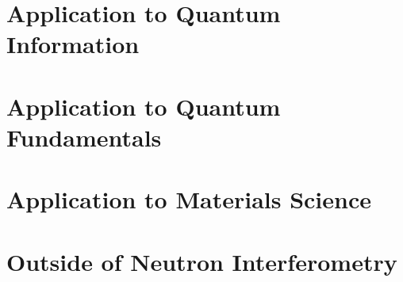\section{Application to Quantum Information}
\section{Application to Quantum Fundamentals}
\section{Application to Materials Science}
\section{Outside of Neutron Interferometry}


